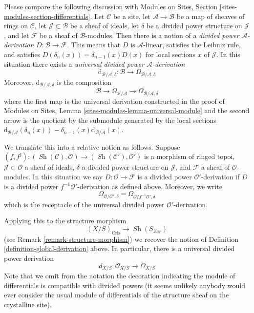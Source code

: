 \documentclass{stacks-project}
\theoremstyle{plain}
\theoremstyle{definition}
\theoremstyle{remark}
\numberwithin{equation}{subsection}
\def\Sh{\mathop{\mathit{Sh}}\nolimits}
\begin{document}
\medskip\noindent
Please compare the following discussion with
Modules on Sites, Section \ref{sites-modules-section-differentials}. Let
$\mathcal{C}$ be a site, let $\mathcal{A} \to \mathcal{B}$ be a
map of sheaves of rings on $\mathcal{C}$, let $\mathcal{J} \subset \mathcal{B}$
be a sheaf of ideals, let $\delta$ be a divided power structure on
$\mathcal{J}$, and let $\mathcal{F}$ be a sheaf of $\mathcal{B}$-modules.
Then there is a notion of a {\it divided power $\mathcal{A}$-derivation}
$D : \mathcal{B} \to \mathcal{F}$. This means that $D$ is $\mathcal{A}$-linear,
satisfies the Leibniz rule, and satisfies
$D(\delta_n(x)) = \delta_{n - 1}(x)D(x)$ for local sections $x$ of
$\mathcal{J}$. In this situation there exists a
{\it universal divided power $\mathcal{A}$-derivation}
$$
\text{d}_{\mathcal{B}/\mathcal{A}, \delta} :
\mathcal{B}
\longrightarrow
\Omega_{\mathcal{B}/\mathcal{A}, \delta}
$$
Moreover, $\text{d}_{\mathcal{B}/\mathcal{A}, \delta}$ is the composition
$$
\mathcal{B}
\longrightarrow
\Omega_{\mathcal{B}/\mathcal{A}}
\longrightarrow
\Omega_{\mathcal{B}/\mathcal{A}, \delta}
$$
where the first map is the universal derivation constructed in the proof
of Modules on Sites, Lemma \ref{sites-modules-lemma-universal-module}
and the second arrow is the quotient by the submodule generated by
the local sections
$\text{d}_{\mathcal{B}/\mathcal{A}}(\delta_n(x)) -
\delta_{n - 1}(x)\text{d}_{\mathcal{B}/\mathcal{A}}(x)$.

\medskip\noindent
We translate this into a relative notion as follows. Suppose
$(f, f^\sharp) : (\Sh(\mathcal{C}), \mathcal{O}) \to
(\Sh(\mathcal{C}'), \mathcal{O}')$ is a morphism of ringed topoi,
$\mathcal{J} \subset \mathcal{O}$ a sheaf of ideals, $\delta$ a
divided power structure on $\mathcal{J}$, and $\mathcal{F}$ a sheaf
of $\mathcal{O}$-modules. In this situation we say
$D : \mathcal{O} \to \mathcal{F}$ is a divided power $\mathcal{O}'$-derivation
if $D$ is a divided power $f^{-1}\mathcal{O}'$-derivation as defined above.
Moreover, we write
$$
\Omega_{\mathcal{O}/\mathcal{O}', \delta} =
\Omega_{\mathcal{O}/f^{-1}\mathcal{O}', \delta}
$$
which is the receptacle of the universal divided power
$\mathcal{O}'$-derivation.

\medskip\noindent
Applying this to the structure morphism
$$
(X/S)_{\text{Cris}} \longrightarrow \Sh(S_{Zar})
$$
(see Remark \ref{remark-structure-morphism}) we recover the notion of
Definition \ref{definition-global-derivation} above.
In particular, there is a universal divided power derivation
$$
d_{X/S} : \mathcal{O}_{X/S} \to \Omega_{X/S}
$$
Note that we omit from the notation the decoration indicating the
module of differentials is compatible with divided powers (it seems
unlikely anybody would ever consider the usual module of differentials
of the structure sheaf on the crystalline site).
\end{document}
